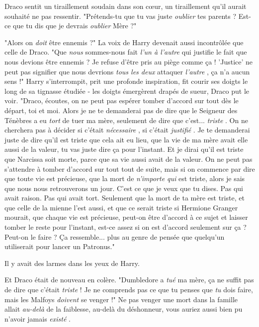 Draco sentit un tiraillement soudain dans son cœur, un tiraillement qu'il aurait souhaité ne pas ressentir. "Prétends-tu que tu vas juste \emph{oublier}  tes parents ? Est-ce que tu dis que je devrais \emph{oublier}  Mère ?"

"Alors on \emph{doit}  être ennemis ?" La voix de Harry devenait aussi incontrôlée que celle de Draco. "Que \emph{nous } sommes-nous fait \emph{l'un à l'autre}  qui justifie le fait que nous devions être ennemis ? Je refuse d'être pris au piège comme ça ! 'Justice' ne peut pas signifier que nous devrions \emph{tous les deux}  attaquer \emph{l'autre} , ça n'a aucun sens !" Harry s'interrompit, prit une profonde inspiration, fit courir ses doigts le long de sa tignasse étudiée - les doigts émergèrent drapés de sueur, Draco put le voir. "Draco, écoutes, on ne peut pas espérer tomber d'accord sur tout dès le départ, toi et moi. Alors je ne te demanderai pas de dire que le Seigneur des Ténèbres a eu \emph{tort}  de tuer ma mère, seulement de dire que c'est... \emph{triste} . On ne cherchera pas à décider si c'était \emph{nécessaire} , si c'était \emph{justifié} . Je te demanderai juste de dire qu'il est triste que cela ait eu lieu, que la vie de ma mère avait elle aussi de la valeur, tu vas juste dire ça pour l'instant. Et je dirai qu'il est triste que Narcissa soit morte, parce que sa vie aussi avait de la valeur. On ne peut pas s'attendre à tomber d'accord sur tout tout de suite, mais si on commence par dire que toute vie est précieuse, que la mort de \emph{n'importe qui}  est triste, alors je sais que nous nous retrouverons un jour. C'est ce que je veux que tu dises. Pas qui avait raison. Pas qui avait tort. Seulement que la mort de ta mère est triste, et que celle de la mienne l'est aussi, et que ce serait triste si Hermione Granger mourait, que chaque vie est précieuse, peut-on être d'accord à ce sujet et laisser tomber le reste pour l'instant, est-ce assez si on est d'accord seulement sur ça ? Peut-on le faire ? Ça ressemble... plus au genre de pensée que quelqu'un utiliserait pour lancer un Patronus."

Il y avait des larmes dans les yeux de Harry.

Et Draco était de nouveau en colère. "Dumbledore a \emph{tué}  ma mère, ça ne suffit pas de dire que c'était \emph{triste}  ! Je ne comprends pas ce que tu penses que \emph{tu}  dois faire, mais les Malfoys \emph{doivent}  se venger !" Ne pas venger une mort dans la famille allait \emph{au-delà}  de la faiblesse, au-delà du déshonneur, vous auriez aussi bien pu n'avoir jamais \emph{existé} .

